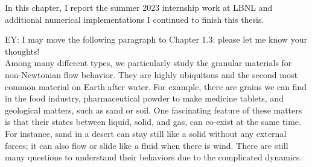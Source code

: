 \par
In this chapter, I report the summer 2023 internship work at LBNL and additional numerical implementations I continued to finish this thesis.

\par
{\color{blue}EY: I may move the following paragraph to Chapter 1.3: please let me know your thoughts!}
\\
Among many different types, we particularly study the granular materials for non-Newtonian flow behavior. They are highly ubiquitous and the second most common material on Earth after water. For example, there are grains we can find in the food industry, pharmaceutical powder to make medicine tablets, and geological matters, such as sand or soil.
One fascinating feature of these matters is that their states between liquid, solid, and gas, can co-exist at the same time. For instance, sand in a desert can stay still like a solid without any external forces; it can also flow or slide like a fluid when there is wind.
There are still many questions to understand their behaviors due to the complicated dynamics.



